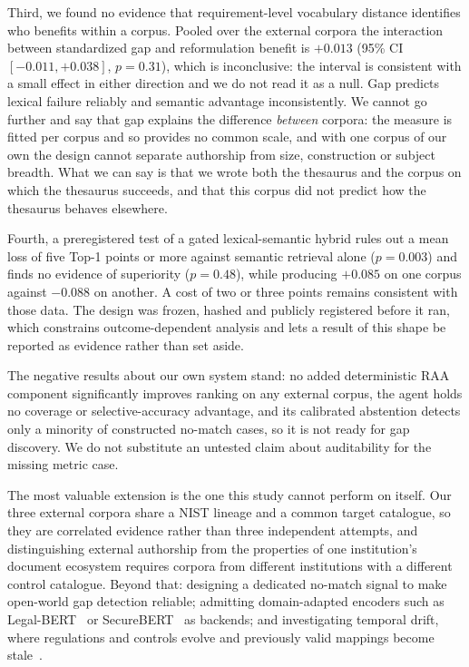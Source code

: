 \documentclass[a4paper,fleqn]{cas-sc}
\begin{document}
Third, we found no evidence that requirement-level vocabulary distance identifies who benefits within a corpus. Pooled over the external corpora the interaction between standardized gap and reformulation benefit is $+0.013$ (95\% CI $[-0.011, +0.038]$, $p = 0.31$), which is inconclusive: the interval is consistent with a small effect in either direction and we do not read it as a null. Gap predicts lexical failure reliably and semantic advantage inconsistently. We cannot go further and say that gap explains the difference \emph{between} corpora: the measure is fitted per corpus and so provides no common scale, and with one corpus of our own the design cannot separate authorship from size, construction or subject breadth. What we can say is that we wrote both the thesaurus and the corpus on which the thesaurus succeeds, and that this corpus did not predict how the thesaurus behaves elsewhere.

Fourth, a preregistered test of a gated lexical-semantic hybrid rules out a mean loss of five Top-1 points or more against semantic retrieval alone ($p = 0.003$) and finds no evidence of superiority ($p = 0.48$), while producing $+0.085$ on one corpus against $-0.088$ on another. A cost of two or three points remains consistent with those data. The design was frozen, hashed and publicly registered before it ran, which constrains outcome-dependent analysis and lets a result of this shape be reported as evidence rather than set aside.

The negative results about our own system stand: no added deterministic RAA component significantly improves ranking on any external corpus, the agent holds no coverage or selective-accuracy advantage, and its calibrated abstention detects only a minority of constructed no-match cases, so it is not ready for gap discovery. We do not substitute an untested claim about auditability for the missing metric case.

The most valuable extension is the one this study cannot perform on itself. Our three external corpora share a NIST lineage and a common target catalogue, so they are correlated evidence rather than three independent attempts, and distinguishing external authorship from the properties of one institution's document ecosystem requires corpora from different institutions with a different control catalogue. Beyond that: designing a dedicated no-match signal to make open-world gap detection reliable; admitting domain-adapted encoders such as Legal-BERT~\citep{Chalkidis2020} or SecureBERT~\citep{Aghaei2022} as backends; and investigating temporal drift, where regulations and controls evolve and previously valid mappings become stale~\citep{Gama2014}.
\end{document}
